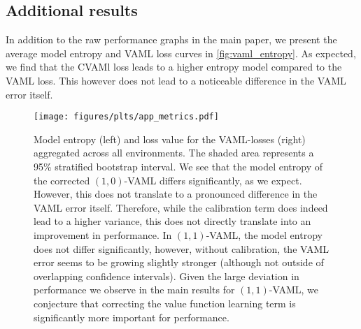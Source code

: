 \subsection{Additional results}

In addition to the raw performance graphs in the main paper, we present the average model entropy and VAML loss curves in \autoref{fig:vaml_entropy}.
As expected, we find that the CVAMl loss leads to a higher entropy model compared to the VAML loss.
This however does not lead to a noticeable difference in the VAML error itself.

\begin{figure}[h]
    \centering
    \texttt{[image: figures/plts/app\_metrics.pdf]} 
    \caption{Model entropy (left) and loss value for the VAML-losses (right) aggregated across all environments. The shaded area represents a 95\% stratified bootstrap interval. We see that the model entropy of the corrected $(1,0)$-VAML differs significantly, as we expect. However, this does not translate to a pronounced difference in the VAML error itself. Therefore, while the calibration term does indeed lead to a higher variance, this does not directly translate into an improvement in performance. In $(1,1)$-VAML, the model entropy does not differ significantly, however, without calibration, the VAML error seems to be growing slightly stronger (although not outside of overlapping confidence intervals). Given the large deviation in performance we observe in the main results for $(1,1)$-VAML, we conjecture that correcting the value function learning term is significantly more important for performance.}
   \label{fig:vaml_entropy}
\end{figure}